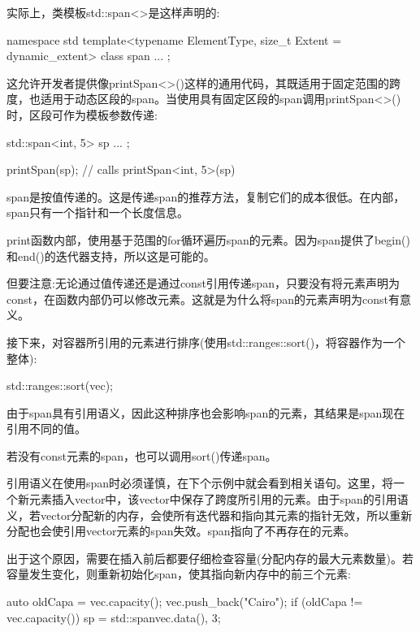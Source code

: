 实际上，类模板std::span<>是这样声明的:

\begin{cpp}
namespace std {
	template<typename ElementType, size_t Extent = dynamic_extent>
	class span {
		...
	};
}
\end{cpp}

这允许开发者提供像printSpan<>()这样的通用代码，其既适用于固定范围的跨度，也适用于动态区段的span。当使用具有固定区段的span调用printSpan<>()时，区段可作为模板参数传递:

\begin{cpp}
std::span<int, 5> sp{ ... };

printSpan(sp); // calls printSpan<int, 5>(sp)
\end{cpp}

span是按值传递的。这是传递span的推荐方法，复制它们的成本很低。在内部，span只有一个指针和一个长度信息。

print函数内部，使用基于范围的for循环遍历span的元素。因为span提供了begin()和end()的迭代器支持，所以这是可能的。

但要注意:无论通过值传递还是通过const引用传递span，只要没有将元素声明为const，在函数内部仍可以修改元素。这就是为什么将span的元素声明为const有意义。


接下来，对容器所引用的元素进行排序(使用std::ranges::sort()，将容器作为一个整体):

\begin{cpp}
std::ranges::sort(vec);
\end{cpp}

由于span具有引用语义，因此这种排序也会影响span的元素，其结果是span现在引用不同的值。

若没有const元素的span，也可以调用sort()传递span。

引用语义在使用span时必须谨慎，在下个示例中就会看到相关语句。这里，将一个新元素插入vector中，该vector中保存了跨度所引用的元素。由于span的引用语义，若vector分配新的内存，会使所有迭代器和指向其元素的指针无效，所以重新分配也会使引用vector元素的span失效。span指向了不再存在的元素。

出于这个原因，需要在插入前后都要仔细检查容量(分配内存的最大元素数量)。若容量发生变化，则重新初始化span，使其指向新内存中的前三个元素:

\begin{cpp}
auto oldCapa = vec.capacity();
vec.push_back("Cairo");
if (oldCapa != vec.capacity()) {
	sp = std::span{vec.data(), 3};
}
\end{cpp}

